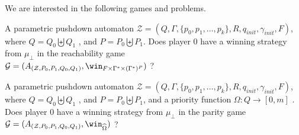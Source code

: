We are interested in the following games and problems.



{A parametric pushdown automaton $\mathcal{Z}= (Q, \Gamma, \{p_0, p_1, \ldots, p_k \}, R, q_{init},  \gamma_{init} , F)$, where $Q = Q_0  \biguplus Q_1 $%
, and $ P = P_0 \biguplus P_1$.}
{Does player $0$ have a winning strategy from $\mu_\bot$ in the reachability game \\
$\mathcal{G} =(A_{(\mathcal{Z}, P_0, P_1, Q_0 , Q_1)}, \win_{F \times \Gamma^* \times (\Gamma^*)^P})$ ?\newline}




{A parametric pushdown automaton $\mathcal{Z}= (Q, \Gamma, \{p_0, p_1, \ldots, p_k \}, R, q_{init}, \gamma_{init} , F)$, where $Q = Q_0  \biguplus Q_1 $%
, and $ P = P_0 \biguplus P_1$, 
and a priority function $\Omega: Q \to [0, m]$%
.}
{Does player $0$ have a winning strategy from $\mu_\bot$ in the parity game \\
$\mathcal{G} =(A_{(\mathcal{Z}, P_0, P_1, Q_0 , Q_1)}, \win_{\widehat{\Omega}})$ ?\newline}

